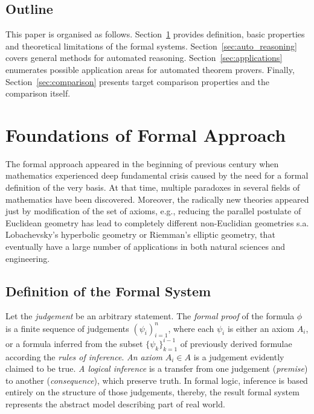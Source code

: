 \documentclass[article]{aaltoseries}
\begin{document}

\subsection{Outline}
This paper is organised as follows.
Section~\ref{sec:formal_theory} provides definition, basic properties and theoretical limitations of the formal systems. Section~\ref{sec:auto_reasoning} covers general methods for automated reasoning. Section~\ref{sec:applications} enumerates possible application areas for automated theorem provers. Finally, Section~\ref{sec:comparison} presents target comparison properties and the comparison itself.


\section{Foundations of Formal Approach}
\label{sec:formal_theory}

The formal approach appeared in the beginning of previous century when mathematics experienced deep fundamental crisis caused by the need for a formal definition of the very basis. At that time, multiple paradoxes in several fields of mathematics have been discovered. Moreover, the radically new theories appeared just by modification of the set of axioms, e.g., reducing the parallel postulate of Euclidean geometry has lead to completely different non-Euclidian geometries s.a. Lobachevsky's hyperbolic geometry or Riemman's elliptic geometry, that eventually have a large number of applications in both natural sciences and engineering.

\subsection{Definition of the Formal System}
\label{sec:definitions}


Let the \textit{judgement} be an arbitrary statement. The \textit{formal proof} of the formula $\phi$ is a finite sequence of judgements $ ( \psi_i )_{i=1}^{n} $, where each $\psi_i$ is either an axiom $A_i$, or a formula inferred from the subset $\{ \psi_k \}_{k=1}^{i-1}$ of previously derived formulae according the \textit{rules of inference}. \textit{An axiom} $A_i \in A$ is a judgement evidently claimed to be true. \textit{A logical inference} is a transfer from one judgement (\textit{premise}) to another (\textit{consequence}), which preserve truth. In formal logic, inference is based entirely on the structure of those judgements, thereby, the result formal system represents the abstract model describing part of real world. 
\end{document}
